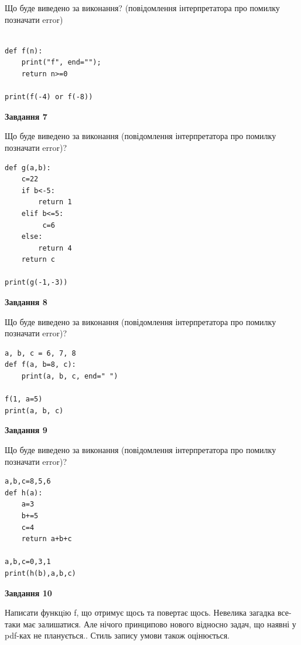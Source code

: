 \documentclass[12pt, ukrainian]{article}
\begin{document}
{\begin {large}
Що буде виведено за виконання? (повідомлення інтерпретатора про помилку позначати error)\par
\begin{verbatim}

def f(n):
    print("f", end="");
    return n>=0

print(f(-4) or f(-8))
\end{verbatim}

{\begin {center}\textbf{Завдання 7}\end {center}}

Що буде виведено за виконання (повідомлення інтерпретатора про помилку позначати error)?\par
\begin{verbatim}
def g(a,b):
    c=22
    if b<-5:
        return 1
    elif b<=5:
         c=6
    else: 
        return 4
    return c

print(g(-1,-3))
\end{verbatim}

{\begin {center}\textbf{Завдання 8}\end {center}}

Що буде виведено за виконання (повідомлення інтерпретатора про помилку позначати error)?\par
\begin{verbatim}
a, b, c = 6, 7, 8
def f(a, b=8, c):
    print(a, b, c, end=" ")

f(1, a=5)
print(a, b, c)
\end{verbatim}

{\begin {center}\textbf{Завдання 9}\end {center}}

Що буде виведено за виконання (повідомлення інтерпретатора про помилку позначати error)?\par
\begin{verbatim}
a,b,c=8,5,6
def h(a):
    a=3
    b+=5
    c=4
    return a+b+c

a,b,c=0,3,1
print(h(b),a,b,c)
\end{verbatim}

{\begin {center}\textbf{Завдання 10}\end {center}}


Написати функцiю f, що отримує щось та повертає щось. Невелика загадка все-таки має залишатися. Але нічого принципово нового відносно задач, що наявні у pdf-ках не планується.. Стиль запису умови також оцінюється.\par
\end {large}}
\newpage
\end{document}
